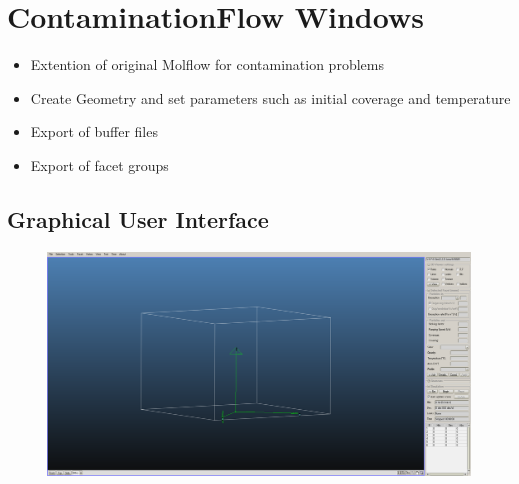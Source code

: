 
\chapter{ContaminationFlow Windows}\label{chapter:Windows}

\begin{itemize}[noitemsep,topsep=0pt]
\item Extention of original Molflow for contamination problems
\item Create Geometry and set parameters such as initial coverage and temperature
\item Export of buffer files
\item Export of facet groups %
\end{itemize}

\section{Graphical User Interface}
\begin{figure}[h]
\includegraphics[width=\linewidth]{figures/ContWin}
\end{figure}

